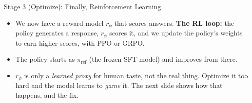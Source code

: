 \begin{frame}{Stage 3 (Optimize): Finally, Reinforcement Learning}
\begin{itemize}\itemsep0.5em
    \item We now have a reward model $r_\phi$ that scores answers. \textbf{The RL
          loop:} the policy generates a response, $r_\phi$ scores it, and we update
          the policy's weights to earn higher scores, with PPO or GRPO.
    \item The policy starts as $\pi_{\text{ref}}$ (the frozen SFT model) and
          improves from there.
    \item {} $r_\phi$ is only a \emph{learned proxy} for human taste,
          not the real thing. Optimize it too hard and the model learns to
          \emph{game} it. The next slide shows how that happens, and the fix.
\end{itemize}
\end{frame}

